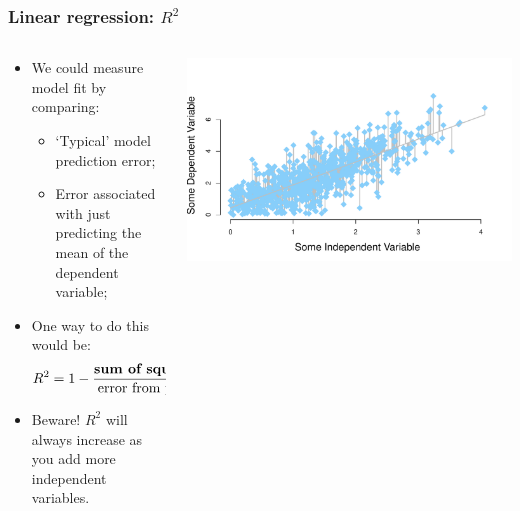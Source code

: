 \documentclass[aspectratio=169]{beamer}
\theoremstyle{principle}
\begin{document}
\begin{frame}
\frametitle{Linear regression: $R^2$}

\begin{columns}
\begin{column}{0.5\textwidth}

\begin{itemize}
\item We could measure model fit by comparing:
\begin{itemize}
\item `Typical' model prediction error;
\item Error associated with just predicting the mean of the dependent variable;
 \end{itemize}
\bigskip

\item One way to do this would be:
\begin{align*}
R^2 = 1 - \frac{\mbox{\textbf{sum of squared residuals}}}{\mbox{error from predicting mean}}
\end{align*}

\item[] \color{white}Beware!  $R^2$ will always increase as you add more independent variables.
\end{itemize}

\end{column}
\begin{column}{0.5\textwidth}

\includegraphics[scale=0.35]{point_cloud_line_residual.pdf}

\end{column}
\end{columns}

\end{frame}
\end{document}

